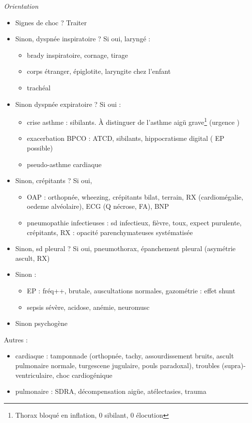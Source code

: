 \documentclass{article}
\begin{document}
\textit{Orientation} 
\begin{itemize}
  \item Signes de choc ? Traiter
  \item Sinon, dyspnée inspiratoire ? Si oui, laryngé : 
    \begin{itemize}
      \item brady inspiratoire, cornage, tirage
      \item {corps étranger, épiglotite, laryngite} chez l'enfant
      \item trachéal
    \end{itemize}
  \item Sinon  dyspnée expiratoire ? Si oui : 
    \begin{itemize}
      \item crise asthme : sibilants. À distinguer de l'asthme aigü
        grave\footnote{Thorax bloqué en inflation, 0 sibilant, 0 élocution}
        (urgence \danger)
      \item exacerbation BPCO : ATCD, sibilants, hippocratisme digital (\danger
        EP possible)
      \item pseudo-asthme cardiaque
    \end{itemize}
  \item Sinon, crépitants ? Si oui, 
    \begin{itemize}
      \item OAP : orthopnée, wheezing, crépitants bilat, terrain, RX
        (cardiomégalie, oedeme alvéolaire), ECG (Q nécrose, FA), BNP \inc
      \item pneumopathie infectieuses : sd infectieux, fièvre, toux, expect
        purulente, crépitants, RX : opacité parenchymateuses systématisée
    \end{itemize}
  \item Sinon, sd pleural ? Si oui, pneumothorax, épanchement pleural (asymétrie
    ascult, RX)
  \item Sinon : 
    \begin{itemize}
      \item EP : fréq++, brutale, auscultations normales, gazométrie : effet
        shunt
      \item sepsis sévère, acidose, anémie, neuromusc
    \end{itemize}
  \item Sinon psychogène
\end{itemize}

Autres :
\begin{itemize}
  \item cardiaque : tamponnade (orthopnée, tachy, assourdissement bruits, ascult
    pulmonaire normale, turgescene jugulaire, pouls paradoxal), troubles
    (supra)-ventriculaire, choc cardiogénique
  \item pulmonaire : SDRA, décompensation aigüe, atélectasies, trauma
\end{itemize}
\end{document}
